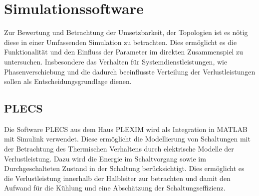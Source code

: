 \section{Simulationssoftware}
Zur Bewertung und Betrachtung der Umsetzbarkeit, der Topologien ist es nötig diese in einer Umfassenden Simulation zu betrachten. Dies ermöglicht es die Funktionalität und den Einfluss der Parameter im direkten Zusammenspiel zu untersuchen. Insbesondere das Verhalten für Systemdienstleistungen, wie Phasenverschiebung und die dadurch beeinflusste Verteilung der Verlustleistungen sollen als Entscheidungsgrundlage dienen. 

	\subsection{PLECS}
	Die Software \gls{PLECS} aus dem Haus PLEXIM wird als Integration in MATLAB mit Simulink verwendet.  Diese ermöglicht die Modellierung von Schaltungen mit der Betrachtung des Thermischen Verhaltens durch elektrische Modelle der Verlustleistung. Dazu wird die Energie im Schaltvorgang sowie im Durchgeschalteten Zustand in der Schaltung berücksichtigt. Dies ermöglicht es die Verlustleistung innerhalb der Halbleiter zur betrachten und damit den Aufwand für die Kühlung und eine Abschätzung der Schaltungseffizienz. 